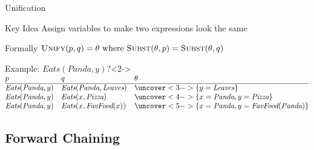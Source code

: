 \documentclass[14pt]{beamer}
\begin{document}
\begin{frame}{Unification}
\begin{block}{Key Idea}
Assign variables to make two expressions look the same
\end{block}
\begin{block}{Formally}
$\textsc{Unify}(p, q) = \theta \mbox{ where } \textsc{Subst}(\theta, p) = \textsc{Subst}(\theta, q)$
\end{block}
\begin{block}{Example: $\textit{Eats}(\textit{Panda}, y)$?}<2->
\footnotesize
$
\begin{array}{@{} l l l @{}}
p & q & \theta \\
\hline
\textit{Eats}(\textit{Panda}, y)
& \textit{Eats}(\textit{Panda}, \textit{Leaves})
& \uncover<3->{\{y=\textit{Leaves}\}}
\\
\textit{Eats}(\textit{Panda}, y)
& \textit{Eats}(x, \textit{Pizza})
& \uncover<4->{\{x=\textit{Panda}, y=\textit{Pizza}\}}
\\
\textit{Eats}(\textit{Panda}, y)
& \textit{Eats}(x, \textit{FavFood}(x))
& \uncover<5->{\{x=\textit{Panda}, y=\textit{FavFood}(\textit{Panda})\}}
\end{array}
$
\end{block}
\end{frame}

\subsection{Forward Chaining}
\end{document}
